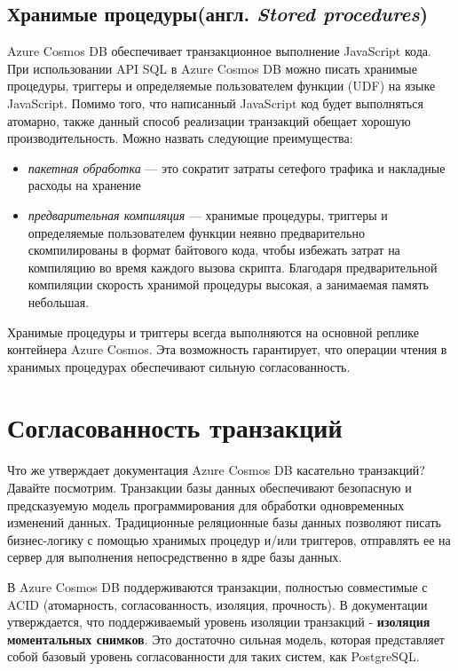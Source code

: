 \documentclass[12pt,  openany]{book}
\begin{document}
\subsection{Хранимые процедуры(англ. \textit{Stored procedures})}
Azure Cosmos DB обеспечивает транзакционное выполнение JavaScript кода. При использовании API SQL в Azure Cosmos DB можно писать хранимые процедуры, триггеры и определяемые пользователем функции (UDF) на языке JavaScript.
Помимо того, что написанный JavaScript код будет выполняться атомарно, также данный  способ реализации транзакций обещает хорошую производительность. Можно назвать следующие преимущества:
\begin{itemize}
\item \textit{пакетная обработка} --- это сократит затраты сетефого трафика и накладные расходы на хранение
\item  \textit{предварительная компиляция} --- хранимые процедуры, триггеры и определяемые пользователем функции неявно предварительно скомпилированы в формат байтового кода, чтобы избежать затрат на компиляцию во время каждого вызова скрипта. Благодаря предварительной компиляции скорость хранимой процедуры высокая, а занимаемая память небольшая.
\end{itemize}
\par
Хранимые процедуры и триггеры всегда выполняются на основной реплике контейнера Azure Cosmos. Эта возможность гарантирует, что операции чтения в хранимых процедурах обеспечивают сильную согласованность. 

\section{Согласованность транзакций}
Что же утверждает документация Azure Cosmos DB касательно транзакций? Давайте посмотрим.
Транзакции базы данных обеспечивают безопасную и предсказуемую модель программирования для обработки одновременных изменений данных. Традиционные реляционные базы данных позволяют писать бизнес-логику с помощью хранимых процедур и/или триггеров, отправлять ее на сервер для выполнения непосредственно в ядре базы данных. 
\par
В Azure Cosmos DB поддерживаются транзакции, полностью совместимые с ACID (атомарность, согласованность, изоляция, прочность). В документации утверждается, что поддерживаемый уровень изоляции транзакций - \textbf{изоляция моментальных снимков}.  Это достаточно сильная модель, которая представляет собой базовый уровень согласованности для таких систем, как PostgreSQL. 
\end{document}

